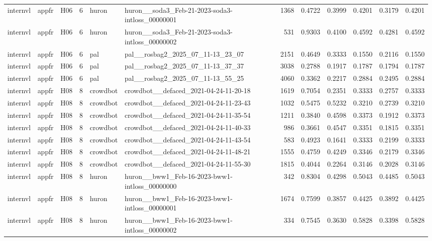 \begin{table}[tbp]
\begin{tabular}{lllrllrrrrrr}
internvl & appfr & H06 & 6 & huron & huron\_\_soda3\_Feb-21-2023-soda3-intloss\_00000001 & 1368 & 0.4722 & 0.3999 & 0.4201 & 0.3179 & 0.4201 \\
internvl & appfr & H06 & 6 & huron & huron\_\_soda3\_Feb-21-2023-soda3-intloss\_00000002 & 531 & 0.9303 & 0.4100 & 0.4592 & 0.4281 & 0.4592 \\
internvl & appfr & H06 & 6 & pal & pal\_\_rosbag2\_2025\_07\_11-13\_23\_07 & 2151 & 0.4649 & 0.3333 & 0.1550 & 0.2116 & 0.1550 \\
internvl & appfr & H06 & 6 & pal & pal\_\_rosbag2\_2025\_07\_11-13\_37\_37 & 3038 & 0.2788 & 0.1917 & 0.1787 & 0.1794 & 0.1787 \\
internvl & appfr & H06 & 6 & pal & pal\_\_rosbag2\_2025\_07\_11-13\_55\_25 & 4060 & 0.3362 & 0.2217 & 0.2884 & 0.2495 & 0.2884 \\
internvl & appfr & H08 & 8 & crowdbot & crowdbot\_\_defaced\_2021-04-24-11-20-18 & 1619 & 0.7054 & 0.2351 & 0.3333 & 0.2757 & 0.3333 \\
internvl & appfr & H08 & 8 & crowdbot & crowdbot\_\_defaced\_2021-04-24-11-23-43 & 1032 & 0.5475 & 0.5232 & 0.3210 & 0.2739 & 0.3210 \\
internvl & appfr & H08 & 8 & crowdbot & crowdbot\_\_defaced\_2021-04-24-11-35-54 & 1211 & 0.3840 & 0.4598 & 0.3373 & 0.1912 & 0.3373 \\
internvl & appfr & H08 & 8 & crowdbot & crowdbot\_\_defaced\_2021-04-24-11-40-33 & 986 & 0.3661 & 0.4547 & 0.3351 & 0.1815 & 0.3351 \\
internvl & appfr & H08 & 8 & crowdbot & crowdbot\_\_defaced\_2021-04-24-11-43-54 & 583 & 0.4923 & 0.1641 & 0.3333 & 0.2199 & 0.3333 \\
internvl & appfr & H08 & 8 & crowdbot & crowdbot\_\_defaced\_2021-04-24-11-48-21 & 1555 & 0.4759 & 0.4249 & 0.3346 & 0.2179 & 0.3346 \\
internvl & appfr & H08 & 8 & crowdbot & crowdbot\_\_defaced\_2021-04-24-11-55-30 & 1815 & 0.4044 & 0.2264 & 0.3146 & 0.2028 & 0.3146 \\
internvl & appfr & H08 & 8 & huron & huron\_\_bww1\_Feb-16-2023-bww1-intloss\_00000000 & 342 & 0.8304 & 0.4298 & 0.5043 & 0.4485 & 0.5043 \\
internvl & appfr & H08 & 8 & huron & huron\_\_bww1\_Feb-16-2023-bww1-intloss\_00000001 & 1674 & 0.7599 & 0.3857 & 0.4425 & 0.3892 & 0.4425 \\
internvl & appfr & H08 & 8 & huron & huron\_\_bww1\_Feb-16-2023-bww1-intloss\_00000002 & 334 & 0.7545 & 0.3630 & 0.5828 & 0.3398 & 0.5828 \\

\end{tabular}
\end{table}
